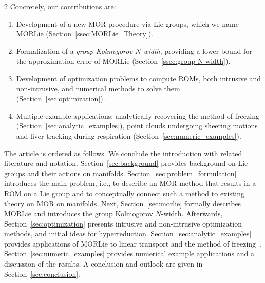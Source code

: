 \documentclass{article}
\begin{document}
\begin{multicols}{2}
Concretely, our contributions are:
\begin{enumerate}
    \item Development of a new MOR procedure via Lie groups, which we name MORLie (Section~\ref{ssec:MORLie_Theory}).
    \item Formalization of a \textit{group Kolmogorov $N$-width}, providing a lower bound for the approximation error of MORLie (Section~\ref{ssec:group-N-width}).
    \item Development of optimization problems to compute ROMs, both intrusive and non-intrusive, and numerical methods to solve them (Section~\ref{sec:optimization}).
    \item Multiple example applications: analytically recovering the method of freezing~\cite{Ohlberger2013} (Section~\ref{sec:analytic_examples}), point clouds undergoing sheering motions and liver tracking during respiration (Section~\ref{sec:numeric_examples}).
\end{enumerate}

The article is ordered as follows. We conclude the introduction with related literature and notation. Section~\ref{sec:background} provides background on Lie groups and their actions on manifolds. Section~\ref{sec:problem_formulation} introduces the main problem, i.e., to describe an MOR method that results in a ROM on a Lie group and to conceptually connect such a method to existing theory on MOR on manifolds.
Next, Section~\ref{sec:morlie} formally describes MORLie and introduces the group Kolmogorov $N$-width. Afterwards, Section~\ref{sec:optimization} presents intrusive and non-intrusive optimization methods, and initial ideas for hyperreduction. Section~\ref{sec:analytic_examples} provides applications of MORLie to linear transport and the method of freezing~\cite{Ohlberger2013}. Section~\ref{sec:numeric_examples} provides numerical example applications and a discussion of the results. A conclusion and outlook are given in Section~\ref{sec:conclusion}. %


\end{multicols}
\end{document}
